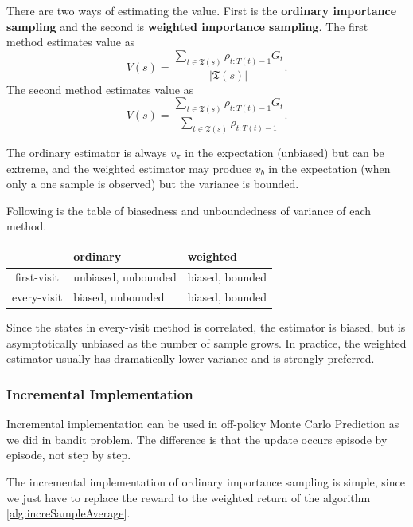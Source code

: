 \documentclass[../../main.tex]{subfiles}
\begin{document}
        There are two ways of estimating the value. First is the \textbf{ordinary importance sampling} and the second is \textbf{weighted importance sampling}.
        The first method estimates value as
        \begin{equation}
            V(s) = \frac{\sum_{t \in \mathfrak{T} (s)}\rho_{t:T(t)-1}G_t}{|\mathfrak{T} (s)|}.
        \end{equation}
        The second method estimates value as
        \begin{equation}
            V(s) = \frac{\sum_{t \in \mathfrak{T} (s)}\rho_{t:T(t)-1}G_t}{\sum_{t \in \mathfrak{T} (s)}\rho_{t:T(t)-1}}.
        \end{equation}

        The ordinary estimator is always $v_\pi$ in the expectation (unbiased) but can be extreme,
        and the weighted estimator may produce $v_b$ in the expectation (when only a one sample is observed)
        but the variance is bounded.

        Following is the table of biasedness and unboundedness of variance of each method.
        
        \begin{center}
            \begin{tabularx}{10cm}{cXX}
                \toprule
                & ordinary & weighted \\
                \midrule
                first-visit & unbiased, unbounded & biased, bounded \\
                \midrule
                every-visit & biased, unbounded & biased, bounded \\
                \bottomrule
            \end{tabularx}
        \end{center}
        Since the states in every-visit method is correlated, the estimator is biased, but is asymptotically unbiased as the number of sample grows.
        In practice, the weighted estimator usually has dramatically lower variance and is strongly preferred.
        \subsubsection{Incremental Implementation}
            Incremental implementation can be used in off-policy Monte Carlo Prediction as we did in bandit problem.
            The difference is that the update occurs episode by episode, not step by step.
            
            The incremental implementation of ordinary importance sampling is simple, since we just have to replace the reward to the weighted return
            of the algorithm \ref{alg:increSampleAverage}.
\end{document}
